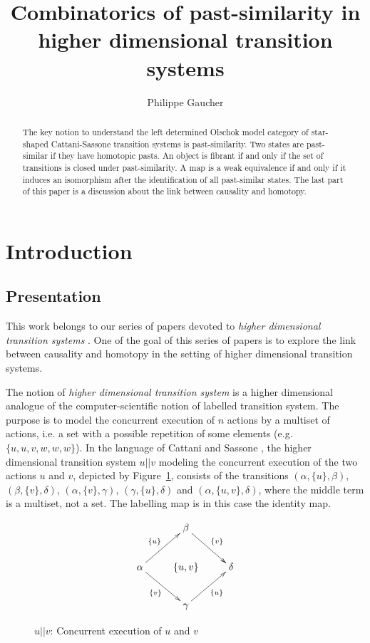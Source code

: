 \documentclass[a4paper,12pt]{amsart}
\title{Combinatorics of past-similarity in higher dimensional transition systems}
\author[P. Gaucher]{Philippe Gaucher}
\begin{document}
\begin{abstract} 
  The key notion to understand the left determined Olschok model
  category of star-shaped Cattani-Sassone transition systems is
  past-similarity.  Two states are past-similar if they have homotopic
  pasts. An object is fibrant if and only if the set of transitions is
  closed under past-similarity. A map is a weak equivalence if and
  only if it induces an isomorphism after the identification of all
  past-similar states. The last part of this paper is a discussion
  about the link between causality and homotopy.
\end{abstract}

\maketitle
\tableofcontents

\section{Introduction}

\subsection{Presentation}

This work belongs to our series of papers devoted to \emph{higher
  dimensional transition systems} \cite{hdts} \cite{cubicalhdts}
\cite{erratum_cubicalhdts} \cite{homotopyprecubical} \cite{biscsts1}
\cite{csts}. One of the goal of this series of papers is to explore
the link between causality and homotopy in the setting of higher
dimensional transition systems.

The notion of \emph{higher dimensional transition system} is a higher
dimensional analogue of the computer-scientific notion of labelled
transition system. The purpose is to model the concurrent execution of
$n$ actions by a multiset of actions, i.e. a set with a possible
repetition of some elements (e.g. $\{u,u,v,w,w,w\}$).  In the language
of Cattani and Sassone \cite{MR1461821}, the higher dimensional
transition system $u||v$ modeling the concurrent execution of the two
actions $u$ and $v$, depicted by Figure~\ref{concab}, consists of the
transitions $(\alpha,\{u\},\beta)$, $(\beta,\{v\},\delta)$,
$(\alpha,\{v\},\gamma)$, $(\gamma,\{u\},\delta)$ and
$(\alpha,\{u,v\},\delta)$, where the middle term is a multiset, not a
set. The labelling map is in this case the identity map.

\begin{figure}
\[
\xymatrix{
& \beta \ar@{->}[rd]^-{\{v\}}&\\
\alpha\ar@{->}[ru]^-{\{u\}}\ar@{->}[rd]_-{\{v\}} & \{u,v\} & \delta\\
&\gamma\ar@{->}[ru]_-{\{u\}}&}
\]
\caption{$u|| v$: Concurrent execution of $u$ and $v$}
\label{concab}
\end{figure}
\end{document}
